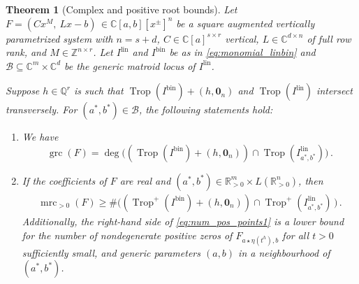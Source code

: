 \documentclass[10pt,a4paper]{amsart}
\newtheorem{theorem}{Theorem}
\newcommand{\CC}{\mathbb{C}}
\newcommand{\QQ}{\mathbb{Q}}
\newcommand{\RR}{\mathbb{R}}
\DeclareMathOperator{\Trop}{Trop}
\newcommand{\bin}{{\mathrm{bin}}}
\DeclareMathOperator{\grc}{grc}
\newcommand{\lin}{{\mathrm{lin}}}
\DeclareMathOperator{\mrc}{mrc}
\begin{document}
\begin{theorem}[Complex and positive root bounds]
\label{thm:monomial_reembedding_bounds}
Let $F=(C x^M ,\: L x - b)\, \in \CC[a,b][x^\pm]^n$ be a square augmented vertically parametrized system
with   $n=s+d$, $C\in \CC[a]^{s\times r}$ vertical, 
$L\in \mathbb{C}^{d\times n}$ of full row rank, and  $M\in \mathbb{Z}^{n\times r}$. 
Let $I^{\lin}$ and $I^{\bin}$ be as in \eqref{eq:monomial_linbin} and $\mathcal{B}\subseteq \CC^m\times\CC^d$ be the  generic matroid locus of $I^{\lin}$.  

Suppose $h\in\QQ^r$ is such that
$\Trop(I^{\bin})+(h,\mathbf{0}_n)$ and $\Trop(I^{\lin})$ intersect transversely. 
For  $(a^*,b^*)\in\mathcal{B}$, the following statements hold:
\begin{enumerate}[label=(\roman*)]
    \item We have
    \[\grc(F)=\deg\big((\Trop(I^{\bin})+(h,\mathbf{0}_{n} )) \cap \Trop(I^{\lin}_{a^*,b^*})\big)\, .\]

   \item 
  If the coefficients of $F$ are real
    and 
    $(a^*,b^*)\in\RR^m_{>0}\times L(\RR^n_{>0})$, then 
    \begin{align}
\label{eq:num_pos_points1} 
    \mrc_{>0}(F)\geq\#\big( (\Trop^+(I^{\bin})+(h,\mathbf{0}_{n} ))\cap \Trop^+(I_{a^*,b^*}^{\lin})\,\big) \, . 
    \end{align}
   Additionally, the right-hand side of \eqref{eq:num_pos_points1} is a lower bound for the number of nondegenerate positive zeros of  $F_{a\star \eta(t^h),b}$ for all $t>0$ sufficiently small, and generic parameters $(a,b)$ in a  neighbourhood of $(a^*,b^*)$.  
\end{enumerate}
\end{theorem}
\end{document}
